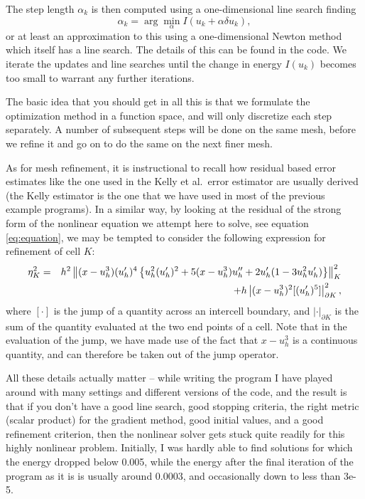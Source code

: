 \documentclass{article}
\begin{document}
The step length $\alpha_k$ is then computed using a one-dimensional line search
finding
\begin{equation}
  \label{eq:linesearch}
  \alpha_k = \arg\min_\alpha I(u_k+\alpha\delta u_k),
\end{equation}
or at least an approximation to this using a one-dimensional Newton method
which itself has a line search. The details of this can be found in the code.
We iterate the updates and line searches until the change in energy $I(u_k)$
becomes too small to warrant any further iterations.

The basic idea that you should get in all this is that we formulate the
optimization method in a function space, and will only discretize each step
separately. A number of subsequent steps will be done on the same mesh, before
we refine it and go on to do the same on the next finer mesh.

As for mesh refinement, it is instructional to recall how residual based error
estimates like the one used in the Kelly et al.~error estimator are usually
derived (the Kelly estimator is the one that we have used in most of the
previous example programs). In a similar way, by looking at the residual of
the strong form of the nonlinear equation we attempt here to solve, see
equation \eqref{eq:equation}, we may be tempted to consider the following
expression for refinement of cell $K$:
\begin{eqnarray}
  \label{eq:error-estimate}
  \eta_K^2 &=&
  h^2 \left\|
    (x-u_h^3) (u_h')^4 \left\{ u_h^2 (u_h')^2 + 5(x-u_h^3)u_h'' + 2u_h'(1-3u_h^2u_h') \right\}
  \right\|^2_K
  \notag \\
  && +
  h \left| (x-u_h^3)^2 [(u_h')^5] \right|^2_{\partial K},
\end{eqnarray}
where $[\cdot]$ is the jump of a quantity across an intercell boundary, and 
$|\cdot|_{\partial K}$ is the sum of the quantity evaluated at the two end
points of a cell. Note that in the evaluation of the jump, we have made use of
the fact that $x-u_h^3$ is a continuous quantity, and can therefore be taken
out of the jump operator.

All these details actually matter -- while writing the program I have played
around with many settings and different versions of the code, and the result
is that if you don't have a good line search, good stopping criteria, the
right metric (scalar product) for the gradient method, good initial values,
and a good refinement criterion, then the nonlinear solver gets stuck quite
readily for this highly nonlinear problem. Initially, I was hardly able to
find solutions for which the energy dropped below 0.005, while the energy
after the final iteration of the program as it is is usually around 0.0003,
and occasionally down to less than 3e-5.
\end{document}
